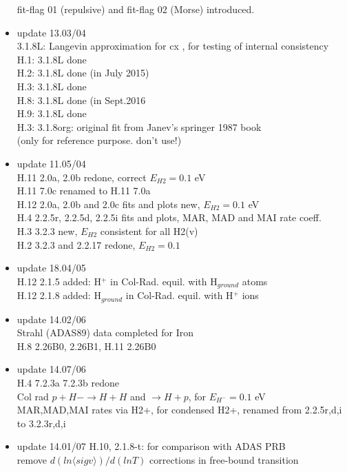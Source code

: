 \documentclass[12pt,dvipdfmx]{article}
\begin{document}
\begin{itemize}
  fit-flag 01 (repulsive) and fit-flag 02 (Morse) introduced.
 \item update  13.03/04 \\
  3.1.8L: Langevin approximation for cx , for testing of internal consistency\\
  H.1:  3.1.8L done  \\
  H.2:  3.1.8L done (in July 2015) \\
  H.3:  3.1.8L done   \\
  H.8:  3.1.8L done (in Sept.2016   \\
  H.9:  3.1.8L done   \\
  H.3:  3.1.8org:  original fit from Janev's springer 1987 book\\
  (only for reference purpose. don't use!)
 \item update  11.05/04 \\
  H.11  2.0a, 2.0b  redone, correct $E_{H2}=0.1$ eV\\
  H.11 7.0c renamed to H.11 7.0a\\
  H.12 2.0a, 2.0b and 2.0c fits and plots new, $E_{H2}=0.1$ eV\\
  H.4  2.2.5r, 2.2.5d, 2.2.5i fits and plots, MAR, MAD and MAI rate coeff.\\
  H.3  3.2.3 new, $E_{H2}$ consistent for all H2(v) \\
  H.2  3.2.3 and 2.2.17 redone, $E_{H2}= 0.1$
 \item update  18.04/05 \\
  H.12 2.1.5 added: H$^+$ in Col-Rad. equil. with H$_{ground}$ atoms\\
  H.12 2.1.8 added: H$_{ground}$ in Col-Rad. equil. with H$^+$ ions\\
 \item update  14.02/06 \\
  Strahl (ADAS89) data completed for Iron \\
  H.8 2.26B0, 2.26B1, H.11 2.26B0
 \item update  14.07/06 \\
 H.4 7.2.3a 7.2.3b redone\\
  Col rad $p + H- \rightarrow H+H$ and $\rightarrow H + p$, for $E_{H^-}=0.1$ eV\\
  MAR,MAD,MAI rates via H2+, for condensed H2+, renamed from 2.2.5r,d,i to 3.2.3r,d,i
 \item update  14.01/07 H.10, 2.1.8-t: for comparison with ADAS PRB \\
  remove $d(ln\langle sigv\rangle)/d(ln T)$ corrections in free-bound transition\\

\end{itemize}
\end{document}
